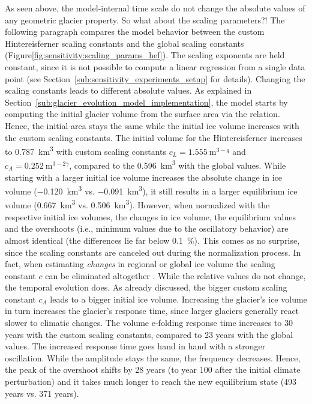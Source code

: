       As seen above, the model-internal time scale do not change the absolute values of any geometric glacier property. So what about the scaling parameters?! The following paragraph compares the model behavior between the custom Hintereisferner scaling constants and the global scaling constants (Figure\ref{fig:sensitivity:scaling_params_hef}). The scaling exponents are held constant, since it is not possible to compute a linear regression from a single data point (see Section~\ref{sub:sensitivity_experiments_setup} for details). %
      Changing the scaling constants leads to different absolute values. As explained in Section~\ref{sub:glacier_evolution_model_implementation}, the \vas{} model starts by computing the initial glacier volume from the surface area via the \vas{} relation. Hence, the initial area stays the same while the initial ice volume increases with the custom scaling constants. The initial volume for the Hintereisferner increases to \SI{0.787}{\cubic\kilo\meter} with custom scaling constants $c_L = \SI{1.555}{\meter^{3-q}}$ and $c_A = \SI{0.252}{\meter^{3-2\gamma}}$, compared to the \SI{0.596}{\cubic\kilo\meter} with the global values. While starting with a larger initial ice volume increases the absolute change in ice volume (\SI{-0.120}{\cubic\kilo\meter} vs. \SI{-0.091}{\cubic\kilo\meter}), it still results in a larger equilibrium ice volume (\SI{0.667}{\cubic\kilo\meter} vs. \SI{0.506}{\cubic\kilo\meter}). However, when normalized with the respective initial ice volumes, the changes in ice volume, the equilibrium values and the overshoots (i.e., minimum values due to the oscillatory behavior) are almost identical (the differences lie far below \SI{0.1}{\percent}). This comes as no surprise, since the scaling constants are canceled out during the normalization process. In fact, when estimating \emph{changes} in regional or global ice volume the scaling constant $c$ can be eliminated altogether \citep[][Section 8.5]{Bahr2015}. While the relative values do not change, the temporal evolution does. As already discussed, the bigger custom scaling constant $c_A$ leads to a bigger initial ice volume. Increasing the glacier's ice volume in turn increases the glacier's response time, since larger glaciers generally react slower to climatic changes. The volume e-folding response time increases to 30 years with the custom scaling constants, compared to 23 years with the global values. The increased response time goes hand in hand with a stronger oscillation. While the amplitude stays the same, the frequency decreases. Hence, the peak of the overshoot shifts by 28 years (to year 100 after the initial climate perturbation) and it takes much longer to reach the new equilibrium state (493 years vs. 371 years).
